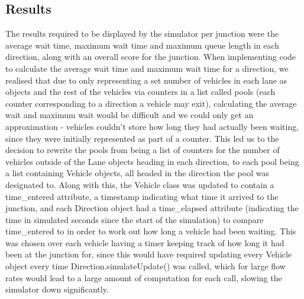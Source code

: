 \documentclass{article}
\begin{document}
    \subsection{Results}\label{subsec:results_backend}
    The results required to be displayed by the simulator per junction were the average wait time, maximum wait time and
    maximum queue length in each direction, along with an overall score for the junction. When implementing code to
    calculate the average wait time and maximum wait time for a direction, we realised that due to only representing a
    set number of vehicles in each lane as objects and the rest of the vehicles via counters in a list called pools
    (each counter corresponding to a direction a vehicle may exit), calculating the average wait and maximum wait would
    be difficult and we could only get an approximation - vehicles couldn’t store how long they had actually been waiting,
    since they were initially represented as part of a counter. This led us to the decision to rewrite the pools from being
    a list of counters for the number of vehicles outside of the Lane objects heading in each direction, to each pool being
    a list containing Vehicle objects, all headed in the direction the pool was designated to. Along with this, the Vehicle
    class was updated to contain a time\_entered attribute, a timestamp indicating what time it arrived to the junction,
    and each Direction object had a time\_elapsed attribute (indicating the time in simulated seconds since the start of
    the simulation) to compare time\_entered to in order to work out how long a vehicle had been waiting. This was chosen
    over each vehicle having a timer keeping track of how long it had been at the junction for, since this would have
    required updating every Vehicle object every time Direction.simulateUpdate() was called, which for large flow rates
    would lead to a large amount of computation for each call, slowing the simulator down significantly.
\end{document}
